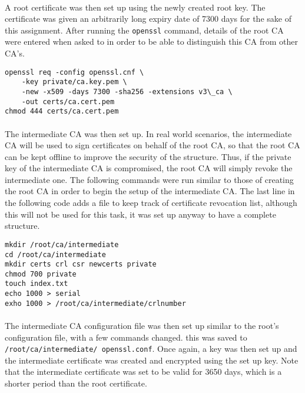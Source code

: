 \paragraph{ }A root certificate was then set up using the newly created root key. The certificate was given an arbitrarily long expiry date of 7300 days for the sake of this assignment. After running the \texttt{openssl} command, details of the root CA were entered when asked to in order to be able to distinguish this CA from other CA's.
\begin{verbatim}
openssl req -config openssl.cnf \
    -key private/ca.key.pem \
    -new -x509 -days 7300 -sha256 -extensions v3\_ca \
    -out certs/ca.cert.pem
chmod 444 certs/ca.cert.pem
\end{verbatim}

\paragraph{ }The intermediate CA was then set up. In real world scenarios, the intermediate CA will be used to sign certificates on behalf of the root CA, so that the root CA can be kept  offline to improve the security of the structure. Thus, if the private key of the intermediate CA is compromised, the root CA will simply revoke the intermediate one. The following commands were run similar to those of creating the root CA in order to begin the setup of the intermediate CA. The last line in the following code adds a file to keep track of certificate revocation list, although this will not be used for this task, it was set up anyway to have a complete structure.
\begin{verbatim}
mkdir /root/ca/intermediate
cd /root/ca/intermediate
mkdir certs crl csr newcerts private
chmod 700 private
touch index.txt
echo 1000 > serial
exho 1000 > /root/ca/intermediate/crlnumber
\end{verbatim}

\paragraph{ }The intermediate CA configuration file was then set up similar to the root's configuration file, with a few commands changed. this was saved to \texttt{/root/ca/intermediate/ openssl.conf}. Once again, a key was then set up and the intermediate certificate was created and encrypted using the set up key. Note that the intermediate certificate was set to be valid for 3650 days, which is a shorter period than the root certificate.

